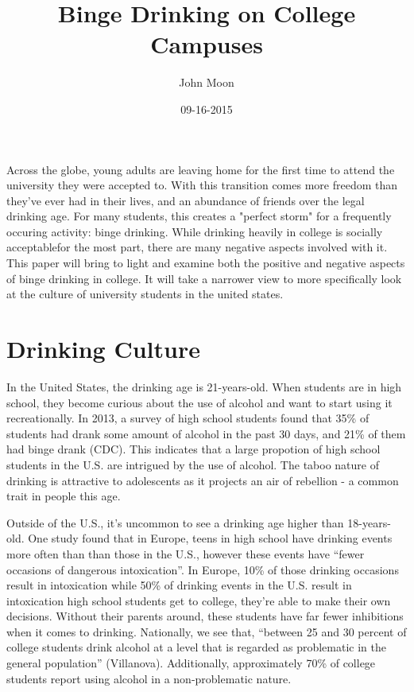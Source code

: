 \documentclass[12pt, doc]{apa6}
\title{Binge Drinking on College Campuses}
\author{John Moon}
\affiliation{San Jose State University}
\date{09-16-2015}
\begin{document}
\maketitle

Across the globe, young adults are leaving home for the first time to attend the university they were accepted to. With this transition comes more freedom than they've ever had in their lives, and an abundance of friends over the legal drinking age. For many students, this creates a "perfect storm" for a frequently occuring activity: binge drinking. While drinking heavily in college is socially acceptablefor the most part, there are many negative aspects involved with it. This paper will bring to light and examine both the positive and negative aspects of binge drinking in college. It will take a narrower view to more specifically look at the culture of university students in the united states.

\section{Drinking Culture}
In the United States, the drinking age is 21-years-old. When students are in high school, they become curious about the use of alcohol and want to start using it recreationally. In 2013, a survey of high school students found that 35\% of students had drank some amount of alcohol in the past 30 days, and 21\% of them had binge drank (CDC). This indicates that a large propotion of high school students in the U.S. are intrigued by the use of alcohol. The taboo nature of drinking is attractive to adolescents as it projects an air of rebellion - a common trait in people this age.

Outside of the U.S., it's uncommon to see a drinking age higher than 18-years-old. One study found that in Europe, teens in high school have drinking events more often than than those in the U.S., however these events have ``fewer occasions of dangerous intoxication''. In Europe, 10\% of those drinking occasions result in intoxication while 50\% of drinking events in the U.S. result in intoxication high school students get to college, they're able to make their own decisions. Without their parents around, these students have far fewer inhibitions when it comes to drinking. Nationally, we see that, ``between 25 and 30 percent of college students drink alcohol at a level that is regarded as problematic in the general population'' (Villanova). Additionally, approximately 70\% of college students report using alcohol in a non-problematic nature.
\end{document}
